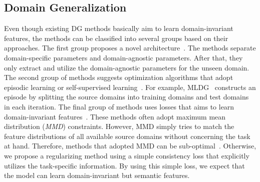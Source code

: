 \subsection{Domain Generalization}
Even though existing DG methods basically aim to learn domain-invariant features, the methods can be classified into several groups based on their approaches. The first group proposes a novel architecture~\cite{Khosla12undobias, Li2017dg}. The methods separate domain-specific parameters and domain-agnostic parameters. After that, they only extract and utilize the domain-agnostic parameters for the unseen domain. The second group of methods suggests optimization algorithms that adopt episodic learning or self-supervised learning~\cite{li2019episodic, Li2018MLDG, NIPS2018_metareg, carlucci2019domain}. For example, MLDG~\cite{Li2018MLDG} constructs an episode by splitting the source domains into training domains and test domains in each iteration. The final group of methods uses losses that aims to learn domain-invariant features~\cite{Ghifary2015mtae, muandet2013domaingeneralization, mmdaaecvpr2018}. These methods often adopt maximum mean distribution (\textit{MMD}) constraints. However, MMD simply tries to match the feature distributions of all available source domains without concerning the task at hand. Therefore, methods that adopted MMD can be sub-optimal~\cite{Saito2018, Saito2018b}. Otherwise, we propose a regularizing method using a simple consistency loss that explicitly utilizes the task-specific information. By using this simple loss, we expect that the model can learn domain-invariant but semantic features.